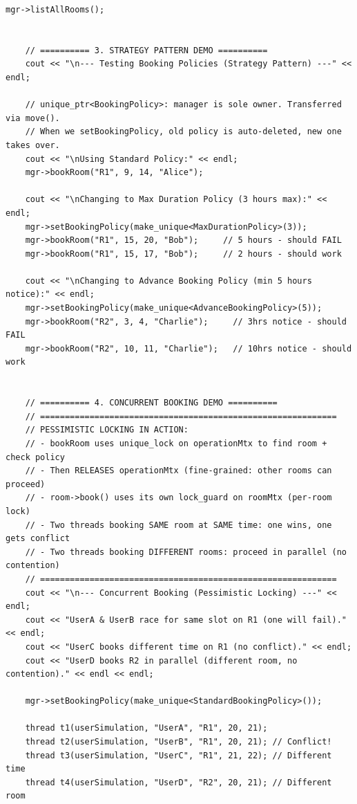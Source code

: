 \documentclass[11pt,a4paper]{article}
\begin{document}
\begin{lstlisting}[title={\texttt{main.cpp}}]
    mgr->listAllRooms();
    
    
    // ========== 3. STRATEGY PATTERN DEMO ==========
    cout << "\n--- Testing Booking Policies (Strategy Pattern) ---" << endl;
    
    // unique_ptr<BookingPolicy>: manager is sole owner. Transferred via move().
    // When we setBookingPolicy, old policy is auto-deleted, new one takes over.
    cout << "\nUsing Standard Policy:" << endl;
    mgr->bookRoom("R1", 9, 14, "Alice");
    
    cout << "\nChanging to Max Duration Policy (3 hours max):" << endl;
    mgr->setBookingPolicy(make_unique<MaxDurationPolicy>(3));
    mgr->bookRoom("R1", 15, 20, "Bob");     // 5 hours - should FAIL
    mgr->bookRoom("R1", 15, 17, "Bob");     // 2 hours - should work
    
    cout << "\nChanging to Advance Booking Policy (min 5 hours notice):" << endl;
    mgr->setBookingPolicy(make_unique<AdvanceBookingPolicy>(5));
    mgr->bookRoom("R2", 3, 4, "Charlie");     // 3hrs notice - should FAIL
    mgr->bookRoom("R2", 10, 11, "Charlie");   // 10hrs notice - should work
    
    
    // ========== 4. CONCURRENT BOOKING DEMO ==========
    // ============================================================
    // PESSIMISTIC LOCKING IN ACTION:
    // - bookRoom uses unique_lock on operationMtx to find room + check policy
    // - Then RELEASES operationMtx (fine-grained: other rooms can proceed)
    // - room->book() uses its own lock_guard on roomMtx (per-room lock)
    // - Two threads booking SAME room at SAME time: one wins, one gets conflict
    // - Two threads booking DIFFERENT rooms: proceed in parallel (no contention)
    // ============================================================
    cout << "\n--- Concurrent Booking (Pessimistic Locking) ---" << endl;
    cout << "UserA & UserB race for same slot on R1 (one will fail)." << endl;
    cout << "UserC books different time on R1 (no conflict)." << endl;
    cout << "UserD books R2 in parallel (different room, no contention)." << endl << endl;
    
    mgr->setBookingPolicy(make_unique<StandardBookingPolicy>());
    
    thread t1(userSimulation, "UserA", "R1", 20, 21);
    thread t2(userSimulation, "UserB", "R1", 20, 21); // Conflict!
    thread t3(userSimulation, "UserC", "R1", 21, 22); // Different time
    thread t4(userSimulation, "UserD", "R2", 20, 21); // Different room
    

\end{lstlisting}
\end{document}

